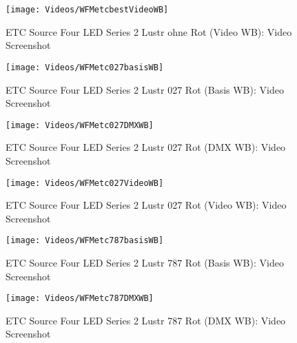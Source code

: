 \documentclass[pagesize,paper=A4,fontsize=12pt,utf8,numbers=noenddot,bibliography=totoc,listof=totoc,DIV=11,BCOR=1mm]{scrreprt}
\begin{document}
\begin{figure}[htp]     %
\centering
\texttt{[image: Videos/WFMetcbestVideoWB]} 
\caption {ETC Source Four LED Series 2 Lustr ohne Rot (Video WB): Video Screenshot} 
\end{figure}



\begin{figure}[htp]     %
\centering
\texttt{[image: Videos/WFMetc027basisWB]} 
\caption {ETC Source Four LED Series 2 Lustr 027 Rot (Basis WB): Video Screenshot} 
\end{figure}

\begin{figure}[htp]     %
\centering
\texttt{[image: Videos/WFMetc027DMXWB]} 
\caption {ETC Source Four LED Series 2 Lustr 027 Rot (DMX WB): Video Screenshot} 
\end{figure}

\begin{figure}[htp]     %
\centering
\texttt{[image: Videos/WFMetc027VideoWB]} 
\caption {ETC Source Four LED Series 2 Lustr 027 Rot (Video WB): Video Screenshot} 
\end{figure}



\begin{figure}[htp]     %
\centering
\texttt{[image: Videos/WFMetc787basisWB]} 
\caption {ETC Source Four LED Series 2 Lustr 787 Rot (Basis WB): Video Screenshot} 
\end{figure}

\begin{figure}[htp]     %
\centering
\texttt{[image: Videos/WFMetc787DMXWB]} 
\caption {ETC Source Four LED Series 2 Lustr 787 Rot (DMX WB): Video Screenshot} 
\end{figure}
\end{document}
